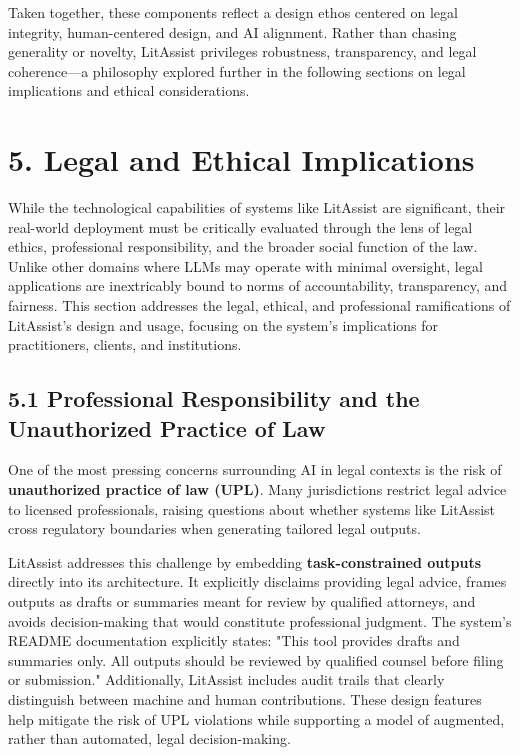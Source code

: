 \documentclass[12pt,a4paper]{article}
\begin{document}
Taken together, these components reflect a design ethos centered on legal integrity, human-centered design, and AI alignment. Rather than chasing generality or novelty, LitAssist privileges robustness, transparency, and legal coherence—a philosophy explored further in the following sections on legal implications and ethical considerations.


\section*{5. Legal and Ethical Implications}

While the technological capabilities of systems like LitAssist are significant, their real-world deployment must be critically evaluated through the lens of legal ethics, professional responsibility, and the broader social function of the law. Unlike other domains where LLMs may operate with minimal oversight, legal applications are inextricably bound to norms of accountability, transparency, and fairness. This section addresses the legal, ethical, and professional ramifications of LitAssist's design and usage, focusing on the system's implications for practitioners, clients, and institutions.

\subsection*{5.1 Professional Responsibility and the Unauthorized Practice of Law}

One of the most pressing concerns surrounding AI in legal contexts is the risk of \textbf{unauthorized practice of law (UPL)}. Many jurisdictions restrict legal advice to licensed professionals, raising questions about whether systems like LitAssist cross regulatory boundaries when generating tailored legal outputs.

LitAssist addresses this challenge by embedding \textbf{task-constrained outputs} directly into its architecture. It explicitly disclaims providing legal advice, frames outputs as drafts or summaries meant for review by qualified attorneys, and avoids decision-making that would constitute professional judgment. The system's README documentation explicitly states: "This tool provides drafts and summaries only. All outputs should be reviewed by qualified counsel before filing or submission." Additionally, LitAssist includes audit trails that clearly distinguish between machine and human contributions. These design features help mitigate the risk of UPL violations while supporting a model of augmented, rather than automated, legal decision-making.
\end{document}
